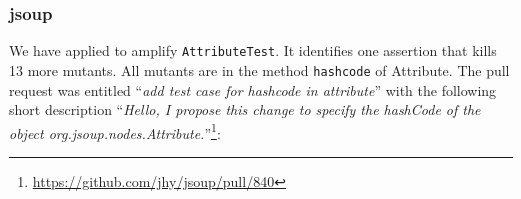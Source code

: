 % 


\subsubsection{jsoup}

We have applied \dspot to amplify \texttt{AttributeTest}. It identifies one assertion that kills 13 more mutants. All mutants are in the method \texttt{hashcode} of Attribute. The pull request was entitled ``\emph{add test case for hashcode in attribute}'' with the following short description ``\emph{Hello, I propose this change to specify the hashCode of the object org.jsoup.nodes.Attribute.}''\footnote{\url{https://github.com/jhy/jsoup/pull/840}}:
\begin{figure}[H]
	\centering{}
\end{figure}

